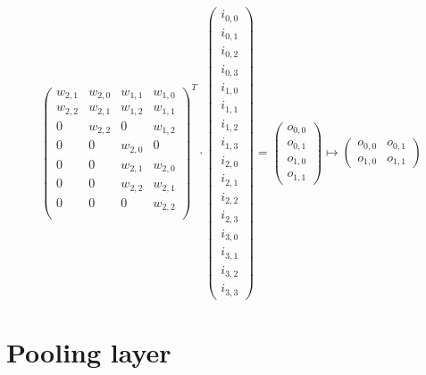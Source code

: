 \begin{example}
\[\begin{pmatrix}
            w_{2,1} & w_{2,0}   & w_{1,1}   & w_{1,0}   \\
            w_{2,2} & w_{2,1}   & w_{1,2}   & w_{1,1}   \\
            0       & w_{2,2}   & 0         & w_{1,2}   \\
            0       & 0         & w_{2,0}   & 0         \\
            0       & 0         & w_{2,1}   & w_{2,0}   \\
            0       & 0         & w_{2,2}   & w_{2,1}   \\
            0       & 0         & 0         & w_{2,2}   \\
        \end{pmatrix}^T
        \cdot
        \begin{pmatrix} i_{0,0} \\ i_{0,1} \\ i_{0,2} \\ i_{0,3} \\ i_{1,0} \\ i_{1,1} \\ i_{1,2} \\ i_{1,3} \\ 
            i_{2,0} \\ i_{2,1} \\ i_{2,2} \\ i_{2,3} \\ i_{3,0} \\ i_{3,1} \\ i_{3,2} \\ i_{3,3} 
        \end{pmatrix} 
        =
        \begin{pmatrix} o_{0,0} \\ o_{0,1} \\ o_{1,0} \\ o_{1,1} \end{pmatrix} 
        \mapsto
        \begin{pmatrix} o_{0,0} & o_{0,1} \\ o_{1,0} & o_{1,1} \end{pmatrix} 
    \]
\end{example}



\section{Pooling layer}

